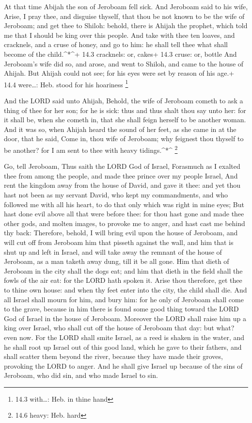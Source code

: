  At that time Abijah the son of Jeroboam fell sick.
 And Jeroboam said to his wife, Arise, I pray thee, and
disguise thyself, that thou be not known to be the wife of Jeroboam; and
get thee to Shiloh: behold, there is Ahijah the prophet, which told me
that I should be king over this people.  And take with thee
ten loaves, and cracknels, and a cruse of honey, and go to him: he shall
tell thee what shall become of the child.\^{}*\^{}+ 14.3 cracknels: or,
cakes+ 14.3 cruse: or, bottle  And Jeroboam's wife did so,
and arose, and went to Shiloh, and came to the house of Ahijah. But
Ahijah could not see; for his eyes were set by reason of his age.+ 14.4
were\ldots: Heb. stood for his hoariness \footnote{14.3 with\ldots: Heb.
  in thine hand}

 And the LORD said unto Ahijah, Behold, the wife of Jeroboam
cometh to ask a thing of thee for her son; for he is sick: thus and thus
shalt thou say unto her: for it shall be, when she cometh in, that she
shall feign herself to be another woman.  And it was so,
when Ahijah heard the sound of her feet, as she came in at the door,
that he said, Come in, thou wife of Jeroboam; why feignest thou thyself
to be another? for I am sent to thee with heavy tidings.\^{}*\^{}
\footnote{14.6 heavy: Heb. hard}

 Go, tell Jeroboam, Thus saith the LORD God of Israel,
Forasmuch as I exalted thee from among the people, and made thee prince
over my people Israel,  And rent the kingdom away from the
house of David, and gave it thee: and yet thou hast not been as my
servant David, who kept my commandments, and who followed me with all
his heart, to do that only which was right in mine eyes; 
But hast done evil above all that were before thee: for thou hast gone
and made thee other gods, and molten images, to provoke me to anger, and
hast cast me behind thy back:  Therefore, behold, I will
bring evil upon the house of Jeroboam, and will cut off from Jeroboam
him that pisseth against the wall, and him that is shut up and left in
Israel, and will take away the remnant of the house of Jeroboam, as a
man taketh away dung, till it be all gone.  Him that dieth
of Jeroboam in the city shall the dogs eat; and him that dieth in the
field shall the fowls of the air eat: for the LORD hath spoken it.
 Arise thou therefore, get thee to thine own house: and
when thy feet enter into the city, the child shall die. 
And all Israel shall mourn for him, and bury him: for he only of
Jeroboam shall come to the grave, because in him there is found some
good thing toward the LORD God of Israel in the house of Jeroboam.
 Moreover the LORD shall raise him up a king over Israel,
who shall cut off the house of Jeroboam that day: but what? even now.
 For the LORD shall smite Israel, as a reed is shaken in
the water, and he shall root up Israel out of this good land, which he
gave to their fathers, and shall scatter them beyond the river, because
they have made their groves, provoking the LORD to anger. 
And he shall give Israel up because of the sins of Jeroboam, who did
sin, and who made Israel to sin.

